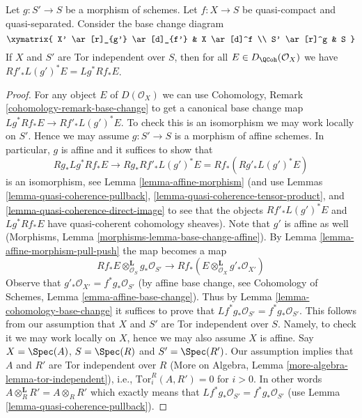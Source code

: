 \begin{lemma}
\label{lemma-compare-base-change}
Let $g : S' \to S$ be a morphism of schemes.
Let $f : X \to S$ be quasi-compact and quasi-separated.
Consider the base change diagram
$$
\xymatrix{
X' \ar[r]_{g'} \ar[d]_{f'} &
X \ar[d]^f \\
S' \ar[r]^g &
S
}
$$
If $X$ and $S'$ are Tor independent over $S$, then for all
$E \in D_\QCoh(\mathcal{O}_X)$ we have
$Rf'_*L(g')^*E = Lg^*Rf_*E$.
\end{lemma}

\begin{proof}
For any object $E$ of $D(\mathcal{O}_X)$ we can use
Cohomology, Remark \ref{cohomology-remark-base-change} to get a
canonical base change map $Lg^*Rf_*E \to Rf'_*L(g')^*E$. To check this
is an isomorphism we may work locally on $S'$. Hence we may assume
$g : S' \to S$ is a morphism of affine schemes. In particular, $g$
is affine and it suffices to show that
$$
Rg_*Lg^*Rf_*E \to Rg_*Rf'_*L(g')^*E = Rf_*(Rg'_* L(g')^* E)
$$
is an isomorphism, see Lemma \ref{lemma-affine-morphism}
(and use Lemmas \ref{lemma-quasi-coherence-pullback},
\ref{lemma-quasi-coherence-tensor-product}, and
\ref{lemma-quasi-coherence-direct-image}
to see that the objects $Rf'_*L(g')^*E$ and $Lg^*Rf_*E$
have quasi-coherent cohomology sheaves). Note that $g'$ is
affine as well (Morphisms, Lemma \ref{morphisms-lemma-base-change-affine}).
By Lemma \ref{lemma-affine-morphism-pull-push} the map becomes a map
$$
Rf_*E \otimes_{\mathcal{O}_S}^\mathbf{L} g_*\mathcal{O}_{S'}
\longrightarrow
Rf_*(E \otimes_{\mathcal{O}_X}^\mathbf{L} g'_*\mathcal{O}_{X'})
$$
Observe that $g'_*\mathcal{O}_{X'} = f^*g_*\mathcal{O}_{S'}$ (by affine
base change, see Cohomology of Schemes, Lemma \ref{emma-affine-base-change}).
Thus by
Lemma \ref{lemma-cohomology-base-change} it suffices to prove that
$Lf^*g_*\mathcal{O}_{S'} = f^*g_*\mathcal{O}_{S'}$. This follows from our
assumption that $X$ and $S'$ are Tor independent over $S$. Namely, to
check it we may work locally on $X$, hence we may also assume $X$ is affine.
Say $X = \Spec(A)$, $S = \Spec(R)$ and $S' = \Spec(R')$. Our assumption
implies that $A$ and $R'$ are Tor independent over $R$
(More on Algebra, Lemma \ref{more-algebra-lemma-tor-independent}), i.e.,
$\text{Tor}_i^R(A, R') = 0$ for $i > 0$. In other words
$A \otimes_R^\mathbf{L} R' = A \otimes_R R'$ which exactly means
that $Lf^*g_*\mathcal{O}_{S'} = f^*g_*\mathcal{O}_{S'}$
(use Lemma \ref{lemma-quasi-coherence-pullback}).
\end{proof}

